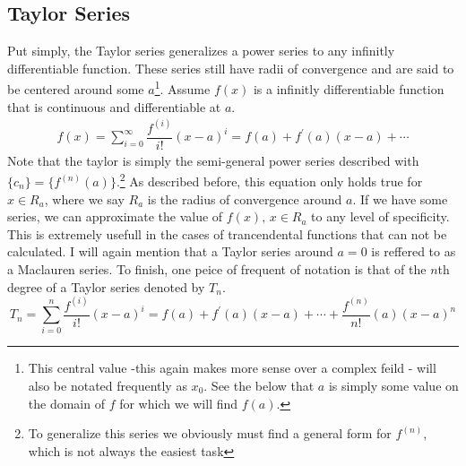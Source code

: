 \documentclass[11pt]{scrreprt}
\begin{document}
	\subsection*{Taylor Series}
		Put simply, the Taylor series generalizes a power series to any infinitly differentiable function. These series still have radii of convergence
		and are said to be centered around some $a$\footnote{This central value -this again makes more sense over a complex feild - will also be notated 
		frequently as $x_0$. See the below that $a$ is simply some value on the domain of $f$ for which we will find $f(a)$.}. Assume $f(x)$ is a 
		infinitly differentiable function that is continuous and differentiable at $a$.
			\begin{align}
				f(x) = \sum_{i = 0}^{\infty} \dfrac{f^{(i)}}{i!} (x - a)^i 
					 = f(a) + f^{'}(a)(x - a) + \cdots
			\end{align}
		Note that the taylor is simply the semi-general power series described with $\{c_n\} = \{f^{(n)}(a)\}$.\footnote{To generalize this series we 
		obviously must find a general form for $f^{(n)}$, which is not always the easiest task} As described before, this equation
		only holds true for $x\in R_a$, where we say $R_a$ is the radius of convergence around $a$. If we have some series, we can approximate
		the value of $f(x),\, x\in R_a$ to any level of specificity. This is extremely usefull in the cases of trancendental functions that can
		not be calculated. I will again mention that a Taylor series around $a = 0$ is reffered to as a Maclauren series. To finish, one peice
		of frequent of notation is that of the $n$th degree of a Taylor series denoted by $T_n$.
			\begin{equation}
				T_n = \sum_{i = 0}^{n} \dfrac{f^{(i)}}{i!} (x - a)^i 
					 = f(a) + f^{'}(a)(x - a) + \cdots + \dfrac{f^{(n)}}{n!}(a)(x - a)^n
			\end{equation}
			
\end{document}
